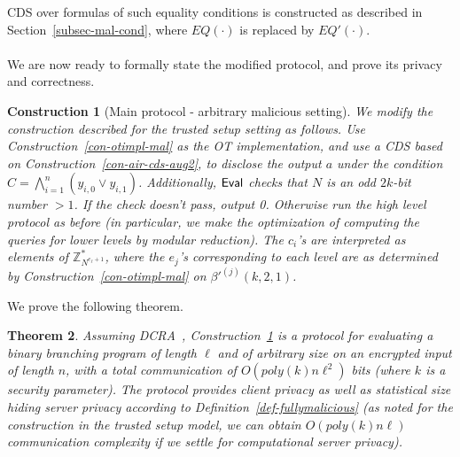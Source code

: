 \documentclass[11pt]{article}
\newtheorem{theorem}{Theorem}[section]{}
\newtheorem{construction}[theorem]{Construction}
\newcommand{\eval}{{\sf Eval}}
\newcommand{\U}[1]{\mathbb{Z}_{#1}^*}
\newcommand\ot{\mbox{OT}\xspace}
\begin{document}
CDS over formulas of such equality conditions is constructed as described in Section~\ref{subsec-mal-cond},
where $EQ(\cdot)$ is replaced by $EQ'(\cdot)$.
\paragraph{}We are now ready to formally state the modified protocol, and prove its privacy and correctness.
\begin{construction}[Main protocol - arbitrary malicious setting]
\label{con-main-fullymal}
We modify the construction described for the trusted setup setting as follows.
Use Construction~\ref{con-otimpl-mal} as the \ot implementation,
and use a CDS based on Construction~\ref{con-air-cds-aug2}, to disclose the output $a$ under the condition $C=\bigwedge^n_{i=1}(y_{i,0}\vee y_{i,1})$.
Additionally, $\eval$ checks that $N$ is an odd $2k$-bit number $>1$. If the check doesn't pass, output 0. Otherwise run the high level protocol as before (in particular, we make the optimization of computing the queries for lower levels by modular reduction). The $c_i$'s are interpreted as elements of $\U{N^{e_{\ell}+1}}$, where the $e_j$'s corresponding to each level are as determined by Construction~\ref{con-otimpl-mal} on $\beta'^{(j)}(k,2,1)$.
\end{construction}
We prove the following theorem.
\begin{theorem}
Assuming DCRA~\cite{DJ01}, Construction~\ref{con-main-fullymal} is a protocol for evaluating a
binary branching program of length $\ell$ and of arbitrary size on
an encrypted input of length $n$, with a total communication of
$O(poly(k)n\ell^2)$ bits (where $k$ is a security parameter). The protocol
provides client privacy as well as statistical size hiding server privacy
according to Definition~\ref{def-fullymalicious} (as noted for the construction in the trusted setup
model, we can obtain $O(poly(k)n\ell)$ communication complexity if we settle for computational server
privacy).
\end{theorem}
\end{document}

